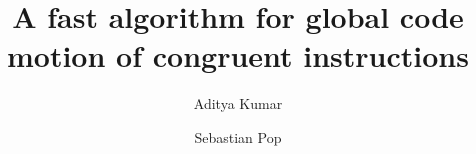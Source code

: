 \documentclass[sigplan,10pt,review,anonymous]{acmart}\settopmatter{printfolios=true,printccs=false,printacmref=false}
\begin{document}
\title[SSA GCM]{A fast algorithm for global code motion of congruent instructions}         %

\def \GCC {GCC}
\def \LLVM {LLVM}
\def \CFG {CFG}
\def \SSA {SSA}
\def \MemorySSA {MemorySSA}
\def \PRE {PRE}
\def \GVN {GVN}
\def \SPEC {SPEC Cpu 2006}
\def \gcm {global-code-motion}
\def \GCM {GCM}
\def \xlinux {x86\_64-linux}
\def \ooo {out-of-order}


\author{Aditya Kumar}

\author{Sebastian Pop}
\end{document}
